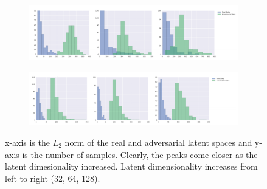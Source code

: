 \documentclass[journal]{IEEEtran}
\begin{document}
\begin{figure}[t]
	\centering
	\captionsetup{justification=centering}

	\begin{subfigure}{\textwidth}
		\centering
		\includegraphics[width=\textwidth]{Images/VAE/MNIST.png}
	\end{subfigure}
	\begin{subfigure}{\textwidth}
		\centering
		\includegraphics[width=\textwidth]{Images/VAE/SVHN.png}
	\end{subfigure}

	\caption{x-axis is the $L_2$ norm of the real and adversarial latent spaces and y-axis is the number of samples. Clearly, the peaks come closer as the latent dimesionality increased. Latent dimensionality increases from left to right (32, 64, 128).}
	
	\label{fig: distance}
\end{figure}
\end{document}
